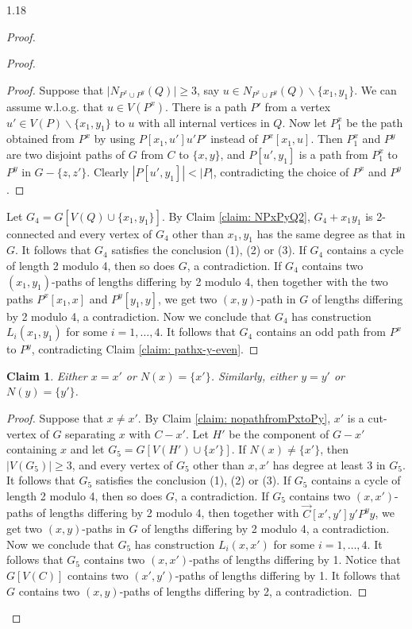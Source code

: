 \documentclass[10pt]{article}
\newtheorem{claim}{Claim}
\begin{document}
\begin{spacing}{1.18}
\begin{proof}
\begin{proof}
    \begin{proof}
        Suppose that $|N_{P^x\cup P^y}(Q)|\geqslant 3$, say $u\in N_{P^x\cup P^y}(Q)\backslash\{x_1,y_1\}$. We can assume w.l.o.g. that $u\in V(P^x)$. There is a path $P'$ from a vertex $u' \in V(P) \backslash \{x_1,y_1\}$ to $u$ with all internal vertices in $Q$. Now let $P_1^x$ be the path obtained from $P^x$ by using $P[x_1,u']u'P'$ instead of $P^x[x_1,u]$. Then $P_1^x$ and $P^y$ are two disjoint paths of $G$ from $C$ to $\{x,y\}$, and $P[u',y_1]$ is a path from $P_1^x$ to $P^y$ in $G-\{z,z'\}$. Clearly $|P[u',y_1]|<|P|$, contradicting the choice of $P^x$ and $P^y$.
    \end{proof}
    
    Let $G_4=G[V(Q)\cup\{x_1,y_1\}]$. By Claim \ref{claim: NPxPyQ2}, $G_4+x_1y_1$ is 2-connected and every vertex of $G_4$ other than $x_1,y_1$ has the same degree as that in $G$. It follows that $G_4$ satisfies the conclusion (1), (2) or (3). If $G_4$ contains a cycle of length 2 modulo 4, then so does $G$, a contradiction. If $G_4$ contains two $(x_1,y_1)$-paths of lengths differing by 2 modulo 4, then together with the two paths $P^x[x_1,x]$ and $P^y[y_1,y]$, we get two $(x,y)$-path in $G$ of lengths differing by 2 modulo 4, a contradiction. Now we conclude that $G_4$ has construction $L_i(x_1,y_1)$ for some $i=1,\ldots,4$. It follows that $G_4$ contains an odd path from $P^x$ to $P^y$, contradicting Claim \ref{claim: pathx-y-even}.
\end{proof}

\begin{claim}\label{claim: x=x'orNx=x'}
    Either $x=x'$ or $N(x)=\{x'\}$. Similarly, either $y=y'$ or $N(y)=\{y'\}$.
\end{claim}

\begin{proof}
    Suppose that $x\neq x'$. By Claim \ref{claim: nopathfromPxtoPy}, $x'$ is a cut-vertex of $G$ separating $x$ with $C-x'$. Let $H'$ be the component of $G-x'$ containing $x$ and let $G_5=G[V(H')\cup\{x'\}]$. If $N(x)\neq\{x'\}$, then $|V(G_5)|\geqslant 3$, and every vertex of $G_5$ other than $x,x'$ has degree at least 3 in $G_5$. It follows that $G_5$ satisfies the conclusion (1), (2) or (3). If $G_5$ contains a cycle of length 2 modulo 4, then so does $G$, a contradiction. If $G_5$ contains two $(x,x')$-paths of lengths differing by 2 modulo 4, then together with $\overrightarrow{C}[x',y']y'P^yy$, we get two $(x,y)$-paths in $G$ of lengths differing by 2 modulo 4, a contradiction. Now we conclude that $G_5$ has construction $L_i(x,x')$ for some $i=1,\ldots,4$. It follows that $G_5$ contains two $(x,x')$-paths of lengths differing by 1. Notice that $G[V(C)]$ contains two $(x',y')$-paths of lengths differing by 1. It follows that $G$ contains two $(x,y)$-paths of lengths differing by 2, a contradiction.


\end{proof}
\end{proof}
\end{spacing}
\end{document}
